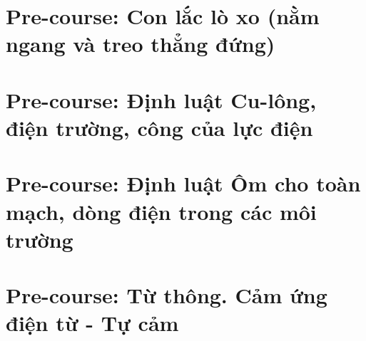 \documentclass[twoside,12pt]{report}
\begin{document}
\chapter{Pre-course: Con lắc lò xo (nằm ngang và treo thẳng đứng)}

\chapter{Pre-course: Định luật Cu-lông, điện trường, công của lực điện}

\chapter{Pre-course: Định luật Ôm cho toàn mạch, dòng điện trong các môi trường}

\chapter{Pre-course: Từ thông. Cảm ứng điện từ - Tự cảm}

\end{document}
